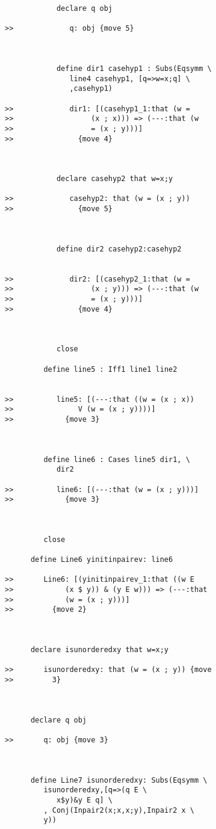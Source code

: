 \documentclass[12pt]{article}
\begin{document}
\begin{verbatim}
            declare q obj

>>             q: obj {move 5}



            define dir1 casehyp1 : Subs(Eqsymm \
               line4 casehyp1, [q=>w=x;q] \
               ,casehyp1)

>>             dir1: [(casehyp1_1:that (w =
>>                  (x ; x))) => (---:that (w
>>                  = (x ; y)))]
>>               {move 4}



            declare casehyp2 that w=x;y

>>             casehyp2: that (w = (x ; y))
>>               {move 5}



            define dir2 casehyp2:casehyp2


>>             dir2: [(casehyp2_1:that (w =
>>                  (x ; y))) => (---:that (w
>>                  = (x ; y)))]
>>               {move 4}



            close

         define line5 : Iff1 line1 line2


>>          line5: [(---:that ((w = (x ; x))
>>               V (w = (x ; y))))]
>>            {move 3}



         define line6 : Cases line5 dir1, \
            dir2

>>          line6: [(---:that (w = (x ; y)))]
>>            {move 3}



         close

      define Line6 yinitinpairev: line6

>>       Line6: [(yinitinpairev_1:that ((w E
>>            (x $ y)) & (y E w))) => (---:that
>>            (w = (x ; y)))]
>>         {move 2}



      declare isunorderedxy that w=x;y

>>       isunorderedxy: that (w = (x ; y)) {move
>>         3}



      declare q obj

>>       q: obj {move 3}



      define Line7 isunorderedxy: Subs(Eqsymm \
         isunorderedxy,[q=>(q E \
            x$y)&y E q] \
         , Conj(Inpair2(x;x,x;y),Inpair2 x \
         y))


\end{verbatim}
\end{document}
